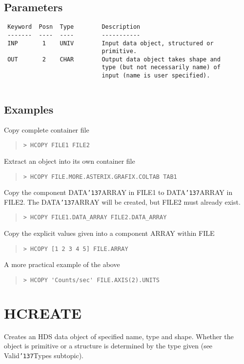 \documentclass{book}
\renewcommand{\_}{{\tt\char'137}}     %
\begin{document}
\subsection{Parameters}
\begin{verbatim}
 Keyword  Posn  Type        Description
 -------  ----  ----        -----------
 INP       1    UNIV        Input data object, structured or
                            primitive.
 OUT       2    CHAR        Output data object takes shape and
                            type (but not necessarily name) of
                            input (name is user specified).
 
\end{verbatim}\subsection{Examples}
Copy complete container file
\begin{quote}\begin{verbatim}
> HCOPY FILE1 FILE2
\end{verbatim}\end{quote}
Extract an object into its own container file
\begin{quote}\begin{verbatim}
> HCOPY FILE.MORE.ASTERIX.GRAFIX.COLTAB TAB1
\end{verbatim}\end{quote}
Copy the component DATA\_ARRAY in FILE1
to DATA\_ARRAY in FILE2. The DATA\_ARRAY
will be created, but FILE2 must already exist.
\begin{quote}\begin{verbatim}
> HCOPY FILE1.DATA_ARRAY FILE2.DATA_ARRAY
\end{verbatim}\end{quote}
Copy the explicit values given into a component ARRAY within FILE
\begin{quote}\begin{verbatim}
> HCOPY [1 2 3 4 5] FILE.ARRAY
\end{verbatim}\end{quote}
A more practical example of the above
\begin{quote}\begin{verbatim}
> HCOPY 'Counts/sec' FILE.AXIS(2).UNITS
\end{verbatim}\end{quote}
\section{HCREATE}
Creates an HDS data object of specified name, type and
shape. Whether the object is primitive or a structure is
determined by the type given (see Valid\_Types subtopic).
 
\end{document}
